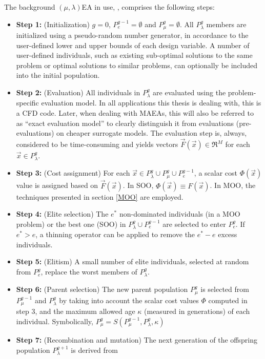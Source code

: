 The background $(\mu,\lambda)$EA in use, \cite{phd_Giotis}, comprises the following steps:
\begin{itemize}
\item[]{\bf Step 1:}  (Initialization) $g=0$, $P_{e}^{g-1}= \emptyset$ and $P_{\mu}^g= \emptyset$. All $P_{\lambda}^g$  members are initialized using a pseudo-random number generator, in accordance to the user-defined lower and upper bounds of each design variable. A number of user-defined individuals, such as existing sub-optimal solutions to the same problem or optimal solutions to similar problems, can optionally be included into the initial population. 
\item[]{\bf Step 2:}  (Evaluation) All individuals in $P_{\lambda}^g$ are evaluated using the problem-specific evaluation model. In all applications this thesis is dealing with, this is a CFD code. Later, when dealing with MAEAs, this will also be referred to as ``exact evaluation model'' to clearly distinguish it from evaluations (pre-evaluations) on cheaper surrogate models. The evaluation step is, always, considered to be time-consuming and yields vectors $\vec{F}(\vec{x}) \in \Re^{M} $ for each $\vec{x} \in P_{\lambda}^g$.
\item[]{\bf Step 3:}  (Cost assignment) For each $\vec{x} \in P_{\lambda}^g \cup P_{\mu}^g \cup P_{e}^{g-1}$, a scalar cost $\Phi(\vec{x})$ value is assigned based on $\vec{F}(\vec{x})$. In SOO, $\Phi(\vec{x}) \equiv F(\vec{x})$. In MOO, the techniques presented in section \ref{MOO} are employed. 
\item[]{\bf Step 4:}  (Elite selection) The $e^*$ non-dominated individuals (in a MOO problem) or the best one (SOO) in $P_{\lambda}^g \cup P_{e}^{g-1}$ are selected to enter $P_e^g$. If $e^*\!>\!e$, a thinning operator \cite{phd_Giotis} can be applied to remove the  $e^*\!-\!e$ excess individuals.     
\item[]{\bf Step 5:}  (Elitism) A small number of elite individuals, selected at random from $P_e^g$, replace the worst members of $P_{\lambda}^g$.  
\item[]{\bf Step 6:}  (Parent selection) The new parent population $P_{\mu}^{g}$ is selected from $P_{\mu}^{g-1}$ and $P_{\lambda}^g$ by taking into account the scalar cost values $\Phi$ computed in step 3, and the maximum allowed age  $\kappa$ (measured in generations) of each individual. Symbolically, $P_{\mu}^{g}=S(P_{\mu}^{g-1},P_{\lambda}^g,\kappa)$ 
\item[]{\bf Step 7:}  (Recombination and mutation) The next generation of the offspring population $P_{\lambda}^{g+1}$ is derived from 

\end{itemize}
